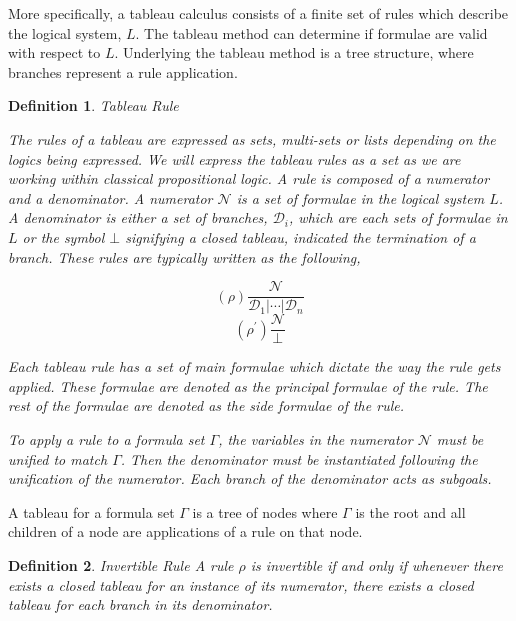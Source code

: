 \documentclass{article}
\newtheorem{definition}{Definition}
\begin{document}
More specifically, a tableau calculus consists of a finite set of rules which
describe the logical system, $L$. The tableau method can determine if formulae
are valid with respect to $L$. Underlying the tableau method is a tree
structure, where branches represent a rule application.

\begin{definition}{Tableau Rule}

The rules of a tableau are expressed as sets, multi-sets or lists depending on
the logics being expressed. We will express the tableau rules as a set as we
are working within classical propositional logic. A rule is composed of a
numerator and a denominator. A numerator $\mathcal{N}$ is a set of formulae in
the logical system $L$. A denominator is either a set of branches,
$\mathcal{D}_i$, which are each sets of formulae in $L$ or the symbol $\bot$
signifying a closed tableau, indicated the termination of a branch. These rules
are typically written as the following,

\begin{multicols}{2}
\begin{equation*}
(\rho)\frac{\mathcal{N}}{\mathcal{D}_1 \vert \cdots \vert \mathcal{D}_n}
\end{equation*}
\break
\begin{equation*}
(\rho^{\prime})\frac{\mathcal{N}}{\bot}
\end{equation*}
\end{multicols}

Each tableau rule has a set of main formulae which dictate the way the rule
gets applied. These formulae are denoted as the \textit{principal formulae} of
the rule. The rest of the formulae are denoted as the \textit{side formulae} of
the rule.

To apply a rule to a formula set $\Gamma$, the variables in the numerator
$\mathcal{N}$ must be unified to match $\Gamma$.  Then the denominator must be
instantiated following the unification of the numerator. Each branch of the
denominator acts as subgoals.

\end{definition}

A tableau for a formula set $\Gamma$ is a tree of nodes where $\Gamma$ is the
root and all children of a node are applications of a rule on that node.

\begin{definition}{Invertible Rule}
A rule $\rho$ is invertible if and only if whenever there exists a closed
tableau for an instance of its numerator, there exists a closed tableau for
each branch in its denominator.
\end{definition}
\end{document}
